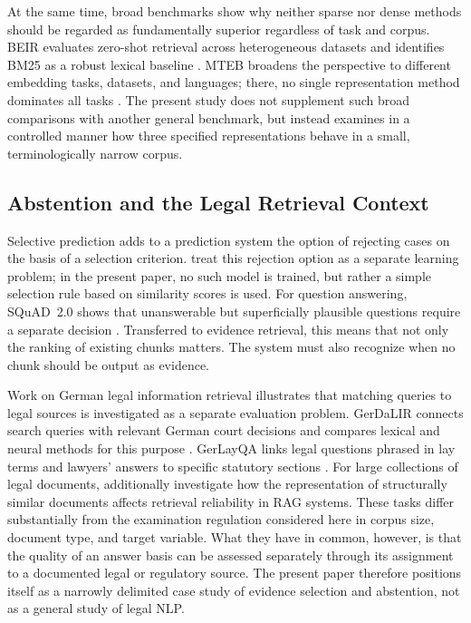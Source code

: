 \documentclass[11pt]{article}
\begin{document}
At the same time, broad benchmarks show why neither sparse nor dense methods should be regarded as fundamentally superior regardless of task and corpus. BEIR evaluates zero-shot retrieval across heterogeneous datasets and identifies BM25 as a robust lexical baseline \citep{thakur2021beir}. MTEB broadens the perspective to different embedding tasks, datasets, and languages; there, no single representation method dominates all tasks \citep{muennighoff-etal-2023-mteb}. The present study does not supplement such broad comparisons with another general benchmark, but instead examines in a controlled manner how three specified representations behave in a small, terminologically narrow corpus.

\subsection{Abstention and the Legal Retrieval Context}

Selective prediction adds to a prediction system the option of rejecting cases on the basis of a selection criterion. \citet{pmlr-v97-geifman19a} treat this rejection option as a separate learning problem; in the present paper, no such model is trained, but rather a simple selection rule based on similarity scores is used. For question answering, SQuAD~2.0 shows that unanswerable but superficially plausible questions require a separate decision \citep{rajpurkar-etal-2018-know}. Transferred to evidence retrieval, this means that not only the ranking of existing chunks matters. The system must also recognize when no chunk should be output as evidence.

Work on German legal information retrieval illustrates that matching queries to legal sources is investigated as a separate evaluation problem. GerDaLIR connects search queries with relevant German court decisions and compares lexical and neural methods for this purpose \citep{wrzalik-krechel-2021-gerdalir}. GerLayQA links legal questions phrased in lay terms and lawyers' answers to specific statutory sections \citep{buttner-habernal-2024-answering}. For large collections of legal documents, \citet{reuter-etal-2025-towards} additionally investigate how the representation of structurally similar documents affects retrieval reliability in RAG systems. These tasks differ substantially from the examination regulation considered here in corpus size, document type, and target variable. What they have in common, however, is that the quality of an answer basis can be assessed separately through its assignment to a documented legal or regulatory source. The present paper therefore positions itself as a narrowly delimited case study of evidence selection and abstention, not as a general study of legal NLP.
\end{document}
